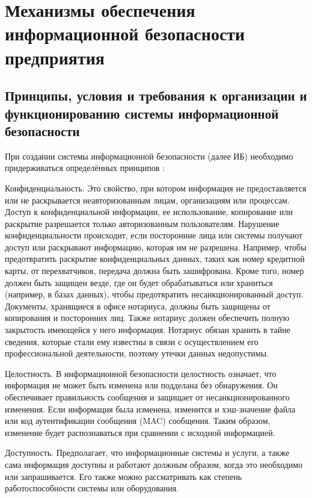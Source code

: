 
\section{Механизмы обеспечения информационной безопасности предприятия}
\label{sec:mechanisms}

\subsection{Принципы, условия и требования к организации и функционированию системы информационной безопасности}
\label{subsec:mechanisms:principles}

При создании системы информационной безопасности (далее ИБ)
необходимо придерживаться определённых принципов \cite{vasilkov}:

Конфиденциальность. Это свойство, при котором информация не
предоставляется или не раскрывается неавторизованным лицам, организациям
или процессам. Доступ к конфиденциальной информации, ее использование,
копирование или раскрытие разрешается только авторизованным
пользователям. Нарушение конфиденциальности происходит, если
посторонние лица или системы получают доступ или раскрывают
информацию, которая им не разрешена. Например, чтобы предотвратить
раскрытие конфиденциальных данных, таких как номер кредитной карты, от
перехватчиков, передача должна быть зашифрована. Кроме того, номер
должен быть защищен везде, где он будет обрабатываться или храниться
(например, в базах данных), чтобы предотвратить несанкционированный
доступ. Документы, хранящиеся в офисе нотариуса, должны быть защищены
от копирования и посторонних лиц. Также нотариус должен обеспечить
полную закрытость имеющейся у него информация. Нотариус обязан хранить
в тайне сведения, которые стали ему известны в связи с осуществлением его
профессиональной деятельности, поэтому утечки данных недопустимы.

Целостность. В информационной безопасности целостность
означает, что информация не может быть изменена или подделана без
обнаружения. Он обеспечивает правильность сообщения и защищает от
несанкционированного изменения. Если информация была изменена,
изменится и хэш-значение файла или код аутентификации сообщения (MAC)
сообщения. Таким образом, изменение будет распознаваться при сравнении с
исходной информацией.

Доступность. Предполагает, что информационные системы и
услуги, а также сама информация доступны и работают должным образом,
когда это необходимо или запрашивается. Его также можно рассматривать как
степень работоспособности системы или оборудования.

